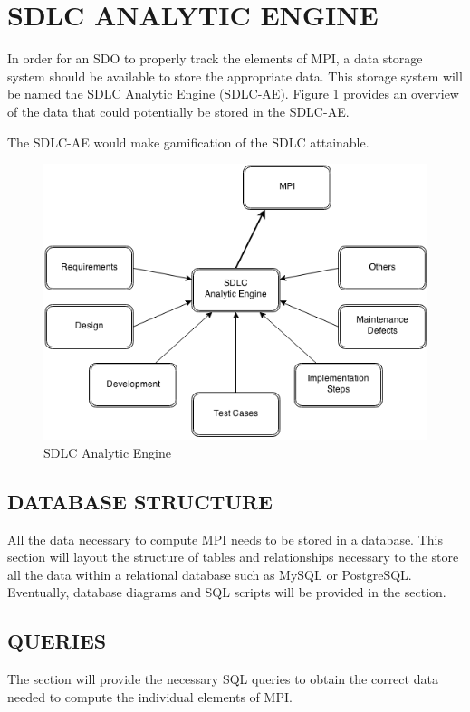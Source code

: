 \documentclass[SDSUThesis.tex]{subfiles}
\begin{document}
\section{SDLC ANALYTIC ENGINE}

In order for an SDO to properly track the elements of MPI, a data storage system should be available to store the appropriate data.   This storage system will be named the SDLC Analytic Engine (SDLC-AE). Figure \ref{fig:sdlc-ae} provides an overview of the data that could potentially be stored in the SDLC-AE.

The SDLC-AE would make gamification of the SDLC attainable.  

\begin{figure}[ht]
\includegraphics[scale=.7]{images/sdlc-ae.png}
\caption{SDLC Analytic Engine}
\label{fig:sdlc-ae}
\end{figure}

\subsection{DATABASE STRUCTURE}
   All the data necessary to compute MPI needs to be stored in a database.  This section will 
   layout the structure of tables and relationships necessary to the store all the data
   within a relational database such as MySQL or PostgreSQL.  Eventually,
   database diagrams and SQL scripts will be provided in the section.

\subsection{QUERIES}
    The section will provide the necessary SQL queries to obtain the correct data
    needed to compute the individual elements of MPI.
    
\end{document}
